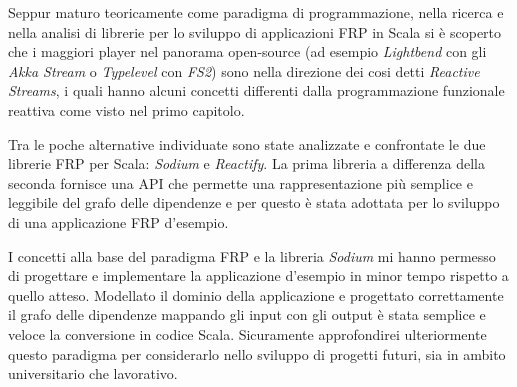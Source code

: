 \documentclass[../main.tex]{subfiles}
\begin{document}
Seppur maturo teoricamente come paradigma di programmazione, nella ricerca e nella analisi di librerie per lo sviluppo di applicazioni FRP in Scala si è scoperto che i maggiori player nel panorama open-source (ad esempio \textit{Lightbend} con gli \textit{Akka Stream} o \textit{Typelevel} con \textit{FS2}) sono nella direzione dei cosi detti \textit{Reactive Streams}, i quali hanno alcuni concetti differenti dalla programmazione funzionale reattiva come visto nel primo capitolo.

Tra le poche alternative individuate sono state analizzate e confrontate le due librerie FRP per Scala: \textit{Sodium} e \textit{Reactify}. La prima libreria a differenza della seconda fornisce una API che permette una rappresentazione più semplice e leggibile del grafo delle dipendenze e per questo è stata adottata per lo sviluppo di una applicazione FRP d'esempio.

I concetti alla base del paradigma FRP e la libreria \textit{Sodium} mi hanno permesso di progettare e implementare la applicazione d'esempio in minor tempo rispetto a quello atteso. Modellato il dominio della applicazione e progettato correttamente il grafo delle dipendenze mappando gli input con gli output è stata semplice e veloce la conversione in codice Scala. Sicuramente approfondirei ulteriormente questo paradigma per considerarlo nello sviluppo di progetti futuri, sia in ambito universitario che lavorativo.
\end{document}
